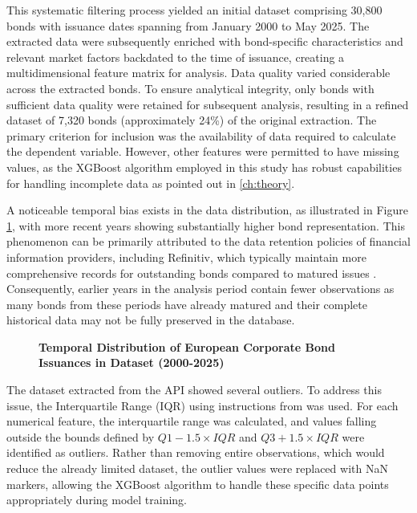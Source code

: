 This systematic filtering process yielded an initial dataset comprising 30,800 bonds with issuance dates spanning from January 2000 to May 2025. The extracted data were subsequently enriched with bond-specific characteristics and relevant market factors backdated to the time of issuance, creating a multidimensional feature matrix for analysis. Data quality varied considerable across the extracted bonds. To ensure analytical integrity, only bonds with sufficient data quality were retained for subsequent analysis, resulting in a refined dataset of 7,320 bonds (approximately 24\%) of the original extraction. The primary criterion for inclusion was the availability of data required to calculate the dependent variable. However, other features were permitted to have missing values, as the XGBoost algorithm employed in this study has robust capabilities for handling incomplete data as pointed out in \ref{ch:theory}.

A noticeable temporal bias exists in the data distribution, as illustrated in Figure \ref{fig:data_availability}, with more recent years showing substantially higher bond representation. This phenomenon can be primarily attributed to the data retention policies of financial information providers, including Refinitiv, which typically maintain more comprehensive records for outstanding bonds compared to matured issues \parencite{Faberov2021RetrieveBond}. Consequently, earlier years in the analysis period contain fewer observations as many bonds from these periods have already matured and their complete historical data may not be fully preserved in the database.

\begin{figure}[h]
    \begin{center}
        
    \end{center}
    \caption{\textbf{Temporal Distribution of European Corporate Bond Issuances in Dataset (2000-2025)}}
    \label{fig:data_availability}
\end{figure}

The dataset extracted from the API showed several outliers. To address this issue, the Interquartile Range (IQR) using instructions from \textcite{Patil2023OutlierMethod} was used. For each numerical feature, the interquartile range was calculated, and values falling outside the bounds defined by $Q1 - 1.5 \times IQR$ and $Q3 + 1.5 \times IQR$ were identified as outliers. Rather than removing entire observations, which would reduce the already limited dataset, the outlier values were replaced with NaN markers, allowing the XGBoost algorithm to handle these specific data points appropriately during model training.

